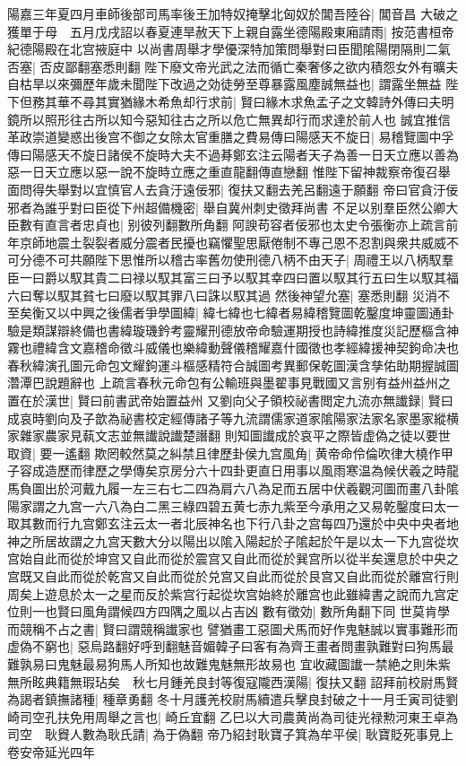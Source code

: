 陽嘉三年夏四月車師後部司馬率後王加特奴掩擊北匈奴於閶吾陸谷|{
	閶音昌}
大破之獲單于母　五月戊戌詔以春夏連旱赦天下上親自露坐德陽殿東廂請雨|{
	按范書桓帝紀德陽殿在北宫掖庭中}
以尚書周舉才學優深特加策問舉對曰臣聞隂陽閉隔則二氣否塞|{
	否皮鄙翻塞悉則翻}
陛下廢文帝光武之法而循亡秦奢侈之欲内積怨女外有曠夫自枯旱以來彌歷年歲未聞陛下改過之効徒勞至尊暴露風塵誠無益也|{
	謂露坐無益}
陛下但務其華不尋其實猶緣木希魚却行求前|{
	賢曰緣木求魚孟子之文韓詩外傳曰夫明鏡所以照形往古所以知今惡知往古之所以危亡無異却行而求達於前人也}
誠宜推信革政崇道變惑出後宫不御之女除太官重膳之費易傳曰陽感天不旋日|{
	易稽覽圖中孚傳曰陽感天不旋日諸侯不旋時大夫不過朞鄭玄注云陽者天子為善一日天立應以善為惡一日天立應以惡一說不旋時立應之重直龍翻傳直戀翻}
惟陛下留神裁察帝復召舉面問得失舉對以宜慎官人去貪汙遠佞邪|{
	復扶又翻去羌呂翻遠于願翻}
帝曰官貪汙佞邪者為誰乎對曰臣從下州超備機密|{
	舉自冀州刺史徵拜尚書}
不足以别羣臣然公卿大臣數有直言者忠貞也|{
	别彼列翻數所角翻}
阿諛苟容者佞邪也太史令張衡亦上疏言前年京師地震土裂裂者威分震者民擾也竊懼聖思厭倦制不專己恩不忍割與衆共威威不可分德不可共願陛下思惟所以稽古率舊勿使刑德八柄不由天子|{
	周禮王以八柄馭羣臣一曰爵以馭其貴二曰禄以馭其富三曰予以馭其幸四曰置以馭其行五曰生以馭其福六曰奪以馭其貧七曰廢以馭其罪八曰誅以馭其過}
然後神望允塞|{
	塞悉則翻}
災消不至矣衡又以中興之後儒者爭學圖緯|{
	緯七緯也七緯者易緯稽覽圖乾鑿度坤靈圖通卦驗是類謀辯終備也書緯璇璣鈐考靈耀刑德放帝命驗運期授也詩緯推度災記歷樞含神霧也禮緯含文嘉稽命徵斗威儀也樂緯動聲儀稽耀嘉什國徵也孝經緯援神契鉤命决也春秋緯演孔圖元命包文耀鉤運斗樞感精符合誠圖考異郵保乾圖漢含孳佑助期握誠圖濳潭巴說題辭也}
上疏言春秋元命包有公輸班與墨翟事見戰國又言别有益州益州之置在於漢世|{
	賢曰前書武帝始置益州}
又劉向父子領校祕書閲定九流亦無䜟録|{
	賢曰成哀時劉向及子歆為祕書校定經傳諸子等九流謂儒家道家隂陽家法家名家墨家縱横家雜家農家見蓻文志並無䜟說䜟楚譖翻}
則知圖䜟成於哀平之際皆虚偽之徒以要世取資|{
	要一遙翻}
欺罔較然莫之糾禁且律歷卦侯九宫風角|{
	黄帝命伶倫吹律大橈作甲子容成造歷而律歷之學傳矣京房分六十四卦更直日用事以風雨寒温為候伏羲之時龍馬負圖出於河戴九履一左三右七二四為肩六八為足而五居中伏羲觀河圖而畫八卦隂陽家謂之九宫一六八為白二黑三綠四碧五黄七赤九紫至今承用之又易乾鑿度曰太一取其數而行九宫鄭玄注云太一者北辰神名也下行八卦之宫每四乃還於中央中央者地神之所居故謂之九宫天數大分以陽出以隂入陽起於子隂起於午是以太一下九宫從坎宫始自此而從於坤宫又自此而從於震宫又自此而從於巽宫所以從半矣還息於中央之宫既又自此而從於乾宫又自此而從於兑宫又自此而從於艮宫又自此而從於離宫行則周矣上遊息於太一之星而反於紫宫行起從坎宫始終於離宫也此雖緯書之說而九宫定位則一也賢曰風角謂候四方四隅之風以占吉凶}
數有徵効|{
	數所角翻下同}
世莫肯學而競稱不占之書|{
	賢曰謂競稱䜟家也}
譬猶畫工惡圖犬馬而好作鬼魅誠以實事難形而虚偽不窮也|{
	惡烏路翻好呼到翻魅音媚韓子曰客有為齊王畫者問畫孰難對曰狗馬最難孰易曰鬼魅最易狗馬人所知也故難鬼魅無形故易也}
宜收藏圖䜟一禁絶之則朱紫無所眩典籍無瑕玷矣　秋七月鍾羌良封等復寇隴西漢陽|{
	復扶又翻}
詔拜前校尉馬賢為謁者鎮撫諸種|{
	種章勇翻}
冬十月護羌校尉馬續遣兵擊良封破之十一月壬寅司徒劉崎司空孔扶免用周舉之言也|{
	崎丘宜翻}
乙巳以大司農黄尚為司徒光禄勲河東王卓為司空　耿䝿人數為耿氏請|{
	為于偽翻}
帝乃紹封耿寶子箕為牟平侯|{
	耿寶貶死事見上卷安帝延光四年}


